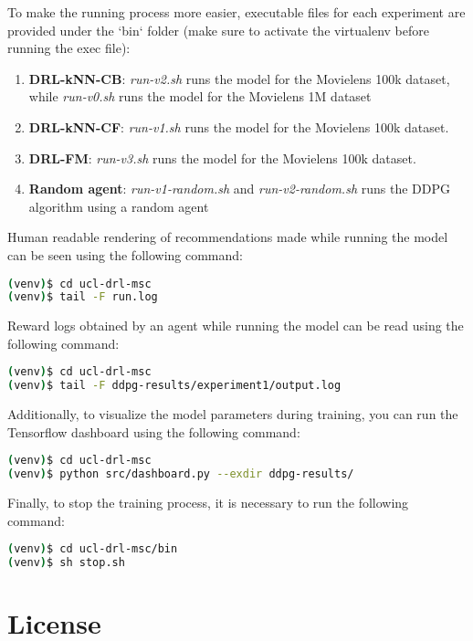 To make the running process more easier, executable files for each experiment are provided under the `bin` folder (make sure to activate the virtualenv before running the exec file):

\begin{enumerate}
\item \textbf{DRL-kNN-CB}: \textit{run-v2.sh} runs the model for the Movielens 100k dataset, while \textit{run-v0.sh} runs the model for the Movielens 1M dataset
\item \textbf{DRL-kNN-CF}: \textit{run-v1.sh} runs the model for the Movielens 100k dataset.
\item \textbf{DRL-FM}: \textit{run-v3.sh} runs the model for the Movielens 100k dataset.
\item \textbf{Random agent}: \textit{run-v1-random.sh} and \textit{run-v2-random.sh} runs the DDPG algorithm using a random agent
\end{enumerate}

Human readable rendering of recommendations made while running the model can be seen using the following command:

\begin{lstlisting}[language=bash]
(venv)$ cd ucl-drl-msc
(venv)$ tail -F run.log
\end{lstlisting}

Reward logs obtained by an agent while running the model can be read using the following command:

\begin{lstlisting}[language=bash]
(venv)$ cd ucl-drl-msc
(venv)$ tail -F ddpg-results/experiment1/output.log
\end{lstlisting}

Additionally, to visualize the model parameters during training, you can run the Tensorflow dashboard using the following command:

\begin{lstlisting}[language=bash]
(venv)$ cd ucl-drl-msc
(venv)$ python src/dashboard.py --exdir ddpg-results/
\end{lstlisting}

Finally, to stop the training process, it is necessary to run the following command:

\begin{lstlisting}[language=bash]
(venv)$ cd ucl-drl-msc/bin
(venv)$ sh stop.sh
\end{lstlisting}

\section{License}

